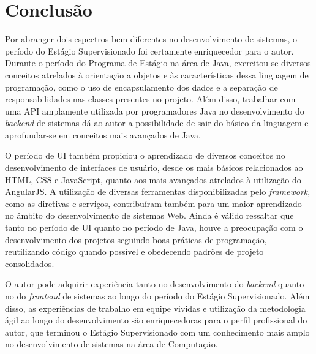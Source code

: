 \chapter{Conclusão}
\label{cap:conclusao}

Por abranger dois espectros bem diferentes no desenvolvimento de sistemas, o período do Estágio Supervisionado foi certamente enriquecedor para o autor. Durante o período do Programa de Estágio na área de Java, exercitou-se diversos conceitos atrelados à orientação a objetos e às características dessa linguagem de programação, como o uso de encapsulamento dos dados e a separação de responsabilidades nas classes presentes no projeto. Além disso, trabalhar com uma API amplamente utilizada por programadores Java no desenvolvimento do \textit{backend} de sistemas dá ao autor a possibilidade de sair do básico da linguagem e aprofundar-se em conceitos mais avançados de Java.

O período de UI também propiciou o aprendizado de diversos conceitos no desenvolvimento de interfaces de usuário, desde os mais básicos relacionados ao HTML, CSS e JavaScript, quanto aos mais avançados atrelados à utilização do AngularJS. A utilização de diversas ferramentas disponibilizadas pelo \textit{framework}, como as diretivas e serviços, contribuíram também para um maior aprendizado no âmbito do desenvolvimento de sistemas Web. Ainda é válido ressaltar que tanto no período de UI quanto no período de Java, houve a preocupação com o desenvolvimento dos projetos seguindo boas práticas de programação, reutilizando código quando possível e obedecendo padrões de projeto consolidados.

O autor pode adquirir experiência tanto no desenvolvimento do \textit{backend} quanto no do \textit{frontend} de sistemas ao longo do período do Estágio Supervisionado. Além disso, as experiências de trabalho em equipe vividas e utilização da metodologia ágil ao longo do desenvolvimento são enriquecedoras para o perfil profissional do autor, que terminou o Estágio Supervisionado com um conhecimento mais amplo no desenvolvimento de sistemas na área de Computação.